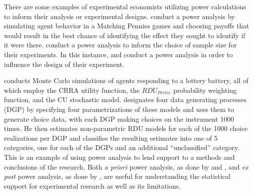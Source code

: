 \documentclass[../main.tex]{subfiles}
\begin{document}
There are some examples of experimental economists utilizing power calculations to inform their analysis or experimental designs.
\textcite{Rutstrom2009} conduct a power analysis by simulating agent behavior in a Matching Pennies games and choosing payoffs that would result in the best chance of identifying the effect they sought to identify if it were there.
\textcite[2]{Brown2016} conduct a power analysis to inform the choice of sample size for their experiments.
In this instance, \textcite{Rutstrom2009} and \textcite{Brown2016} conduct a power analysis in order to influence the design of their experiment.

\textcite[8]{Wilcox2015} conducts Monte Carlo simulations of agents responding to a lottery battery, all of which employ the CRRA utility function, the $\mathit{RDU_{Prelec}}$ probability weighting function, and the CU stochastic model.
\textcite{Wilcox2015} designates four data generating processes (DGP) by specifying four parametrizations of these models and uses them to generate choice data, with each DGP making choices on the instrument 1000 times.
He then estimates non-parametric RDU models for each of the 1000 choice realizations per DGP and classifies the resulting estimates into one of 5 categories, one for each of the DGPs and an additional \enquote{unclassified} category.
This is an example of using power analysis to lend support to a methods and conclusions of the research.
Both \textit{a priori} power analysis, as done by \textcite{Rutstrom2009} and \textcite{Brown2016}, and \textit{ex post} power analysis, as done by \textcite{Wilcox2015}, are useful for understanding the statistical support for experimental research as well as its limitations.
\end{document}
